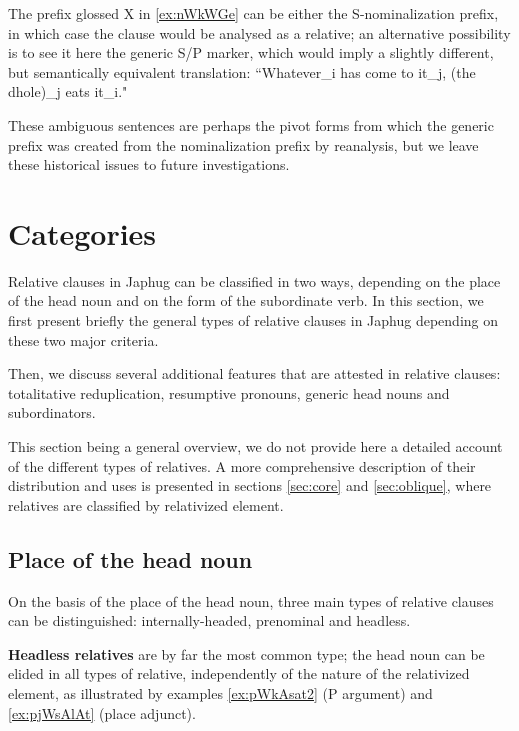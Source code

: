 \documentclass[oldfontcommands,oneside,a4paper,11pt]{article}
\begin{document}
The prefix glossed X in \ref{ex:nWkWGe} can be either the S-nominalization prefix, in which case the clause would be analysed as a relative; an alternative possibility is to see it here the generic S/P marker, which would imply a slightly different, but semantically equivalent  translation: ``Whatever_i has come to it_j, (the dhole)_j eats it_i."

These ambiguous sentences are perhaps the pivot forms from which the generic prefix was created from the nominalization prefix by reanalysis, but we leave these historical issues to  future investigations.

\section{Categories}

Relative clauses in Japhug can be classified in two ways, depending on the place of the head noun and on the form of the subordinate verb. In this section, we first present briefly the general types of relative clauses in Japhug depending on these two major criteria. 

Then, we discuss several additional features that are attested in relative clauses: totalitative reduplication, resumptive pronouns, generic head nouns and subordinators.

This section being a general overview, we do not provide here a detailed account of the different types of relatives. A more comprehensive description of their distribution and uses is presented in sections \ref{sec:core}  and \ref{sec:oblique}, where relatives are classified by relativized element.


\subsection{Place of the head noun}
On the basis of the place of the head noun, three main types of relative clauses can be distinguished: internally-headed, prenominal and headless. 


\textbf{Headless relatives} are by far the most common type; the head noun can be elided in all types of relative, independently of the nature of the relativized element, as illustrated by examples \ref{ex:pWkAsat2} (P argument) and \ref{ex:pjWsAlAt} (place adjunct).
\end{document}
